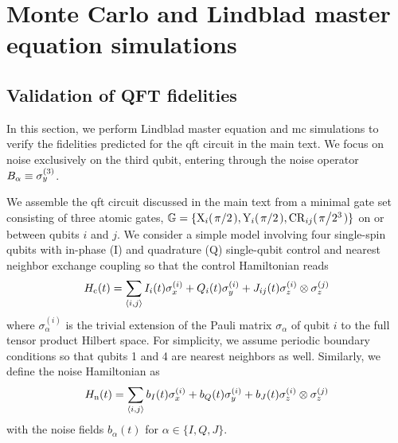 \chapter{Monte Carlo and Lindblad master equation simulations}\label{ch:ff:time_domain_methods}
\section{Validation of QFT fidelities}\label{sec:ff:time_domain_methods:qft_validation}
In this section, we perform Lindblad master equation and \gls{mc} simulations to verify the fidelities predicted for the \gls{qft} circuit in the main text.
We focus on noise exclusively on the third qubit, entering through the noise operator $B_\alpha\equiv\sigma_y^{(3)}$.

We assemble the \gls{qft} circuit discussed in the main text from a minimal gate set consisting of three atomic gates, $\mathbb{G} = \lbrace\mr{X}_{i}(\flatfrac{\pi}{2}),\mr{Y}_{i}(\flatfrac{\pi}{2}),\mr{CR}_{ij}(\flatfrac{\pi}{2^3})\rbrace$ on or between qubits $i$ and $j$.
We consider a simple model involving four single-spin qubits with in-phase (I) and quadrature (Q) single-qubit control and nearest neighbor exchange coupling so that the control Hamiltonian reads
\begin{equation}\label{eq:ff:control_hamiltonian:qft}
    H_{\mathrm{c}}(t) = \sum_{\langle i,j\rangle} I_i(t)\sigma_x^{(i)} + Q_i(t)\sigma_y^{(i)} + J_{ij}(t)\sigma_z^{(i)}\otimes\sigma_z^{(j)}
\end{equation}
where $\sigma_\alpha^{(i)}$ is the trivial extension of the Pauli matrix $\sigma_\alpha$ of qubit $i$ to the full tensor product Hilbert space.
For simplicity, we assume periodic boundary conditions so that qubits 1 and 4 are nearest neighbors as well.
Similarly, we define the noise Hamiltonian as
\begin{equation}\label{eq:ff:noise_hamiltonian:qft}
H_{\mathrm{n}}(t) = \sum_{\langle i,j\rangle} b_{I}(t)\sigma_x^{(i)} + b_{Q}(t)\sigma_y^{(i)} + b_{J}(t)\sigma_z^{(i)}\otimes\sigma_z^{(j)}
\end{equation}
with the noise fields $b_{\alpha}(t)$ for $\alpha\in\{I,Q,J\}$.

